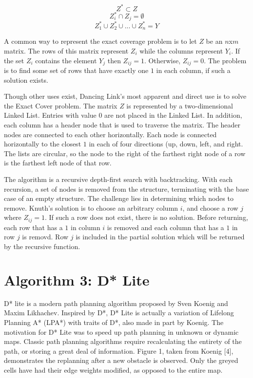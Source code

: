 \documentclass[11pt]{article}
\begin{document}
$$Z^{\ast} \subset Z$$
$$Z_{i}^{\ast} \cap Z_{j} = \emptyset $$
$$Z_{1}^{\ast} \cup Z_{2}^{\ast} \cup ... \cup Z_{n}^{\ast} = Y$$

A common way to represent the exact coverage problem is to let $Z$ be an $n$x$m$ matrix. The rows of this matrix represent $Z_i$ while the columns represent $Y_i$. If the set $Z_i$ contains the element $Y_j$ then $Z_{ij}=1$. Otherwise, $Z_{ij}=0$. The problem is to find some set of rows that have exactly one $1$ in each column, if such a solution exists.

Though other uses exist, Dancing Link's most apparent and direct use is to solve the Exact Cover problem. The matrix $Z$ is represented by a two-dimensional Linked List. Entries with value $0$ are not placed in the Linked List. In addition, each column has a header node that is used to traverse the matrix. The header nodes are connected to each other horizontally. Each node is connected horizontally to the closest $1$ in each of four directions (up, down, left, and right. The lists are circular, so the node to the right of the farthest right node of a row is the farthest left node of that row.

The algorithm is a recursive depth-first search with backtracking. With each recursion, a set of nodes is removed from the structure, terminating with the base case of an empty structure. The challenge lies in determining which nodes to remove. Knuth's solution is to choose an arbitrary column $i$, and choose a row $j$ where $Z_{ij}=1$. If such a row does not exist, there is no solution. Before returning, each row that has a $1$ in column $i$ is removed and each column that has a $1$ in row $j$ is removd. Row $j$ is included in the partial solution which will be returned by the recursive function.

\section*{Algorithm 3: D* Lite}

D* lite is a modern path planning algorithm proposed by Sven Koenig and Maxim Likhachev. Inspired by D*, D* Lite is actually a variation of Lifelong Planning A* (LPA*) with traits of D*, also made in part by Koenig. The motivation for D* Lite was to speed up path planning in unknown or dynamic maps. Classic path planning algorithms require recalculating the entirety of the path, or storing a great deal of information. Figure 1, taken from Koenig [4], demonstrates the replanning after a new obstacle is observed. Only the greyed cells have had their edge weights modified, as opposed to the entire map.
\end{document}
